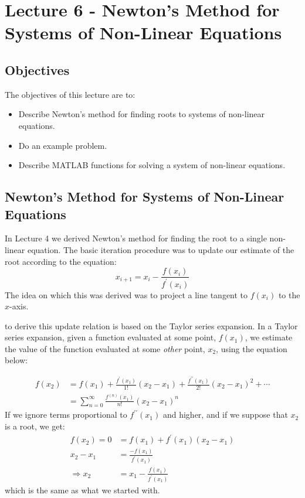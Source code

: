 \chapter{Lecture 6 - Newton's Method for Systems of Non-Linear Equations}
\label{ch:lec6n}
\section{Objectives}
The objectives of this lecture are to:
\begin{itemize}
\item Describe Newton's method for finding roots to systems of non-linear equations.
\item Do an example problem.
\item Describe MATLAB functions for solving a system of non-linear equations.
\end{itemize}
\setcounter{lstannotation}{0}

\section{Newton's Method for Systems of Non-Linear Equations}

In Lecture 4 we derived Newton's method for finding the root to a single non-linear equation.  The basic iteration procedure was to update our estimate of the root according to the equation:
\begin{equation*}
x_{i+1} = x_i - \frac{f(x_i)}{f^{\prime}(x_i)}
\end{equation*}
The idea on which this was derived was to project a line tangent to $f(x_i)$ to the $x$-axis. 

 to derive this update relation is based on the Taylor series expansion.  In a Taylor series expansion, given a function evaluated at some point, $f(x_1)$, we estimate the value of the function evaluated at some \emph{other} point, $x_2$, using the equation below:

\begin{align*}
f(x_2) &= f(x_1) +  \frac{f^{\prime}(x_1)}{1!}(x_2 - x_1) +  \frac{f^{\prime \prime}(x_1)}{2!}(x_2 - x_1)^2 + \cdots \\
&= \sum\limits_{n=0}^{\infty} \frac{f^{(n)}(x_1)}{n!}(x_2 - x_1)^n
\end{align*}
If we ignore terms proportional to $f^{\prime \prime}(x_1)$ and higher, and if we suppose that $x_2$ is a root, we get:
\begin{align*}
f(x_2) = 0 &= f(x_1) + f^{\prime}(x_1)(x_2 - x_1) \\
x_2 - x_1 &= \frac{-f(x_1)}{f^{\prime}(x_1)} \\
\Rightarrow x_2 &= x_1 - \frac{f(x_1)}{f^{\prime}(x_1)} 
\end{align*}
which is the same as what we started with.


